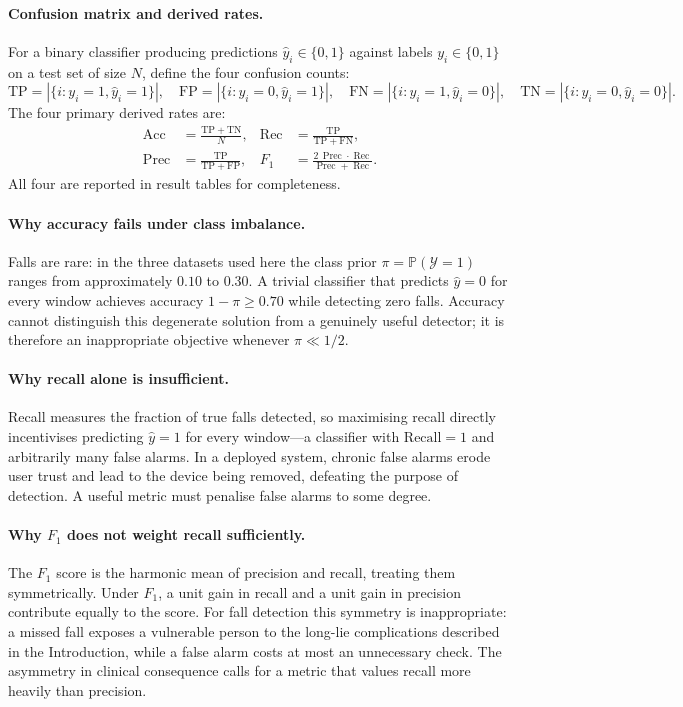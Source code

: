 \documentclass[onluarkali,ingilizce,yukseklisans,karton,LisansustuEgitim]{itutez}
\DeclareMathOperator{\Rec}{Rec}
\DeclareMathOperator{\Prec}{Prec}
\DeclareMathOperator{\Acc}{Acc}
\providecommand{\Prob}{\mathbb{P}}
\providecommand{\1}{\mathbf{1}}
\providecommand{\Y}{\mathcal{Y}}
\begin{document}
\paragraph{Confusion matrix and derived rates.}
For a binary classifier producing predictions $\widehat y_i\in\{0,1\}$ against labels $y_i\in\{0,1\}$ on a test set of size $N$, define the four confusion counts:
\[
  \mathrm{TP}=|\{i:y_i=1,\widehat y_i=1\}|,\quad
  \mathrm{FP}=|\{i:y_i=0,\widehat y_i=1\}|,\quad
  \mathrm{FN}=|\{i:y_i=1,\widehat y_i=0\}|,\quad
  \mathrm{TN}=|\{i:y_i=0,\widehat y_i=0\}|.
\]
The four primary derived rates are:
\begin{align*}
  \Acc  &= \frac{\mathrm{TP}+\mathrm{TN}}{N}, &
  \Rec    &= \frac{\mathrm{TP}}{\mathrm{TP}+\mathrm{FN}}, \\
  \Prec &= \frac{\mathrm{TP}}{\mathrm{TP}+\mathrm{FP}}, &
  F_1                &= \frac{2\,\Prec\cdot\Rec}{\Prec+\Rec}.
\end{align*}
All four are reported in result tables for completeness.

\paragraph{Why accuracy fails under class imbalance.}
Falls are rare: in the three datasets used here the class prior $\pi=\Prob(\Y=1)$ ranges from approximately $0.10$ to $0.30$. A trivial classifier that predicts $\widehat y=0$ for every window achieves accuracy $1-\pi \geq 0.70$ while detecting zero falls. Accuracy cannot distinguish this degenerate solution from a genuinely useful detector; it is therefore an inappropriate objective whenever $\pi \ll 1/2$.

\paragraph{Why recall alone is insufficient.}
Recall measures the fraction of true falls detected, so maximising recall directly incentivises predicting $\widehat y=1$ for every window---a classifier with $\mathrm{Recall}=1$ and arbitrarily many false alarms. In a deployed system, chronic false alarms erode user trust and lead to the device being removed, defeating the purpose of detection. A useful metric must penalise false alarms to some degree.

\paragraph{Why $F_1$ does not weight recall sufficiently.}
The $F_1$ score is the harmonic mean of precision and recall, treating them symmetrically. Under $F_1$, a unit gain in recall and a unit gain in precision contribute equally to the score. For fall detection this symmetry is inappropriate: a missed fall exposes a vulnerable person to the long-lie complications described in the Introduction, while a false alarm costs at most an unnecessary check. The asymmetry in clinical consequence calls for a metric that values recall more heavily than precision.
\end{document}

